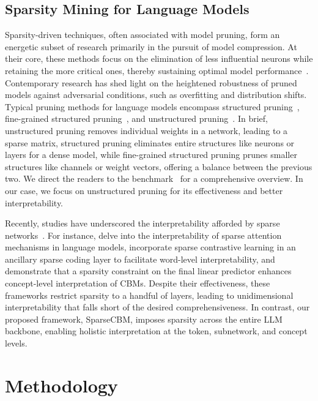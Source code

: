 \documentclass[letterpaper]{article} %
\begin{document}
\subsection{Sparsity Mining for Language Models}
Sparsity-driven techniques, often associated with model pruning, form an energetic subset of research primarily in the pursuit of model compression. At their core, these methods focus on the elimination of less influential neurons while retaining the more critical ones, thereby sustaining optimal model performance~\citep{lecun1990optimal,han2015deep,magnitude,hessian,liu2017learning,he2017channel,zhou2016less}. Contemporary research has shed light on the heightened robustness of pruned models against adversarial conditions, such as overfitting and distribution shifts. 
Typical pruning methods for language models encompass structured pruning~\citep{michel2019sixteen}, fine-grained structured pruning~\citep{lagunas2021block}, and unstructured pruning~\citep{gale2019state}. In brief, unstructured pruning removes individual weights in a network, leading to a sparse matrix, structured pruning eliminates entire structures like neurons or layers for a dense model, while fine-grained structured pruning prunes smaller structures like channels or weight vectors, offering a balance between the previous two. We direct the readers to the benchmark~\cite{liu2023sparsity} for a comprehensive overview. In our case, we focus on unstructured pruning for its effectiveness and better interpretability. 

Recently, studies have underscored the interpretability afforded by sparse networks~\citep{subramanian2018spine}. For instance, \citet{meister2021sparse} delve into the interpretability of sparse attention mechanisms in language models, \citet{liu2022improve} incorporate sparse contrastive learning in an ancillary sparse coding layer to facilitate word-level interpretability, and \citet{oikarinenlabel} demonstrate that a sparsity constraint on the final linear predictor enhances concept-level interpretation of CBMs. Despite their effectiveness, these frameworks restrict sparsity to a handful of layers, leading to unidimensional interpretability that falls short of the desired comprehensiveness. In contrast, our proposed framework, SparseCBM, imposes sparsity across the entire LLM backbone, enabling holistic interpretation at the token, subnetwork, and concept levels.   

\section{Methodology}
\end{document}
